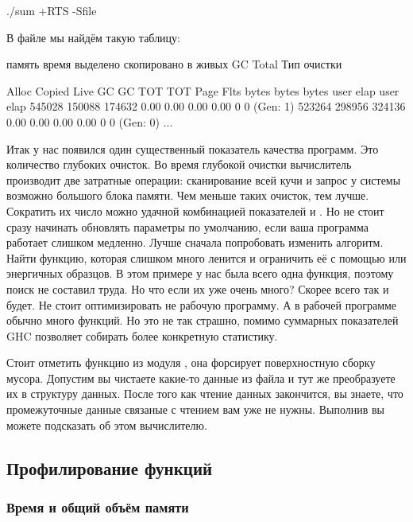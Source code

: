 \begin{code}
./sum +RTS -Sfile
\end{code}

В файле  мы найдём такую таблицу:

\begin{code}
        память                          время
выделено скопировано в живых    GC             Total             Тип очистки

 Alloc    Copied     Live    GC    GC     TOT     TOT  Page Flts
 bytes     bytes     bytes  user  elap    user    elap
545028    150088    174632  0.00  0.00    0.00    0.00    0    0  (Gen:  1)
523264    298956    324136  0.00  0.00    0.00    0.00    0    0  (Gen:  0)
...
\end{code}

Итак у нас появился один существенный показатель качества
программ. Это количество глубоких очисток. Во время глубокой
очистки вычислитель производит две затратные операции:
сканирование всей кучи и запрос у системы возможно большого блока памяти. 
Чем меньше таких очисток, тем лучше. Сократить их число
можно удачной комбинацией показателей  и . 
Но не стоит сразу начинать обновлять параметры по умолчанию,
если ваша программа работает слишком медленно. Лучше 
сначала попробовать изменить алгоритм. Найти
функцию, которая слишком много ленится и ограничить её с помощью 
 или энергичных образцов. 
В этом примере у нас
была всего одна функция, поэтому поиск не составил труда.
Но что если их уже очень много? Скорее всего так и будет.
Не стоит оптимизировать не рабочую программу. 
А в рабочей программе обычно много функций.
Но это не так страшно, помимо суммарных показателей
GHC позволяет собирать более конкретную статистику. 

Стоит отметить 
функцию  из модуля ,
она форсирует поверхностную сборку мусора. 
Допустим вы чистаете какие-то данные из файла и тут 
же преобразуете их в структуру данных. После того
как чтение данных закончится, вы знаете, что промежуточные
данные связаные с чтением вам уже не нужны. Выполнив
 вы можете подсказать об этом вычислителю.

\subsection{Профилирование функций}

\subsubsection{Время и общий объём памяти}


